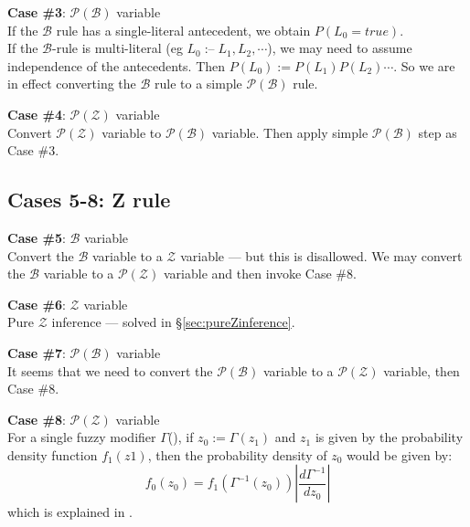 \textbf{Case \#3}: $\mathcal{P}(\mathcal{B})$ variable\\
If the $\mathcal{B}$ rule has a single-literal antecedent, we obtain $P(L_0 = true)$. \\
If the $\mathcal{B}$-rule is multi-literal (eg $L_0 \; \mbox{:--} \; L_1, L_2, \cdots $), we may need to assume independence of the antecedents.  Then $ P(L_0) := P(L_1) P(L_2) \cdots $.  So we are in effect converting the $\mathcal{B}$ rule to a simple $\mathcal{P}(\mathcal{B})$ rule.

\textbf{Case \#4}: $\mathcal{P}(\mathcal{Z})$ variable\\
Convert $\mathcal{P}(\mathcal{Z})$ variable to $\mathcal{P}(\mathcal{B})$ variable.  Then apply simple $\mathcal{P}(\mathcal{B})$ step as Case \#3.

\subsection{Cases 5-8: Z rule}


\textbf{Case \#5}: $\mathcal{B}$ variable\\
Convert the $\mathcal{B}$ variable to a $\mathcal{Z}$ variable --- but this is disallowed.  We may convert the $\mathcal{B}$ variable to a $\mathcal{P}(\mathcal{Z})$ variable and then invoke Case \#8.

\textbf{Case \#6}: $\mathcal{Z}$ variable\\
Pure $\mathcal{Z}$ inference --- solved in \S\ref{sec:pureZinference}.

\textbf{Case \#7}: $\mathcal{P}(\mathcal{B})$ variable\\
It seems that we need to convert the $\mathcal{P}(\mathcal{B})$ variable to a $\mathcal{P}(\mathcal{Z})$ variable, then Case \#8.

\textbf{Case \#8}: $\mathcal{P}(\mathcal{Z})$ variable\\
\label{case8}
For a single fuzzy modifier $\Gamma$(\textperiodcentered), if $z_0 := \Gamma(z_1)$ and $z_1$ is given by the probability density function $f_1(z1)$, then the probability density of $z_0$ would be given by:
\begin{equation}
f_0(z_0) = f_1(\Gamma^{-1}(z_0)) \left | \frac{d\Gamma^{-1}}{dz_0} \right |
\end{equation}
which is explained in \citep*{Wikipedia2008}.

